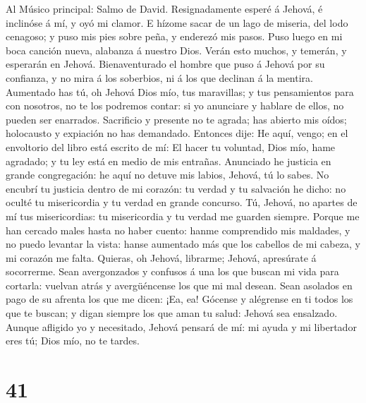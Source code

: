  Al Músico principal: Salmo de David. Resignadamente
esperé á Jehová, é inclinóse á mí, y oyó mi clamor.  E
hízome sacar de un lago de miseria, del lodo cenagoso; y puso mis pies
sobre peña, y enderezó mis pasos.  Puso luego en mi boca
canción nueva, alabanza á nuestro Dios. Verán esto muchos, y temerán, y
esperarán en Jehová.  Bienaventurado el hombre que puso á
Jehová por su confianza, y no mira á los soberbios, ni á los que
declinan á la mentira.  Aumentado has tú, oh Jehová Dios
mío, tus maravillas; y tus pensamientos para con nosotros, no te los
podremos contar: si yo anunciare y hablare de ellos, no pueden ser
enarrados.  Sacrificio y presente no te agrada; has
abierto mis oídos; holocausto y expiación no has demandado.
 Entonces dije: He aquí, vengo; en el envoltorio del libro
está escrito de mí:  El hacer tu voluntad, Dios mío, hame
agradado; y tu ley está en medio de mis entrañas. 
Anunciado he justicia en grande congregación: he aquí no detuve mis
labios, Jehová, tú lo sabes.  No encubrí tu justicia
dentro de mi corazón: tu verdad y tu salvación he dicho: no oculté tu
misericordia y tu verdad en grande concurso.  Tú, Jehová,
no apartes de mí tus misericordias: tu misericordia y tu verdad me
guarden siempre.  Porque me han cercado males hasta no
haber cuento: hanme comprendido mis maldades, y no puedo levantar la
vista: hanse aumentado más que los cabellos de mi cabeza, y mi corazón
me falta.  Quieras, oh Jehová, librarme; Jehová,
apresúrate á socorrerme.  Sean avergonzados y confusos á
una los que buscan mi vida para cortarla: vuelvan atrás y avergüéncense
los que mi mal desean.  Sean asolados en pago de su
afrenta los que me dicen: ¡Ea, ea!  Gócense y alégrense
en ti todos los que te buscan; y digan siempre los que aman tu salud:
Jehová sea ensalzado.  Aunque afligido yo y necesitado,
Jehová pensará de mí: mi ayuda y mi libertador eres tú; Dios mío, no te
tardes.

\hypertarget{section-40}{%
\section{41}\label{section-40}}

